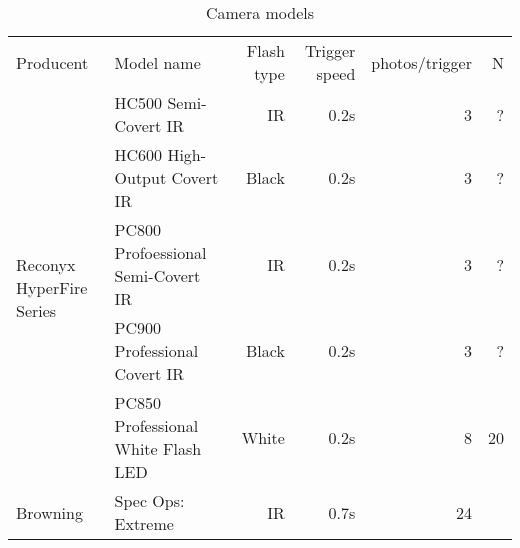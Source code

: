 \begin{table}
\caption{\label{tab:cam_mod} Camera models}
\centering

\begin{tabular}{llrrrr}
\hline
Producent  & Model name & Flash type & Trigger speed & photos/trigger & N \\
\cline{1-2}
\multirow{5}{2cm}{Reconyx HyperFire Series} &
	  HC500 Semi-Covert IR					& IR	& 0.2s & 3 & ? \\
	& HC600 High-Output Covert IR			& Black	& 0.2s & 3 & ? \\
    & PC800 Profoessional Semi-Covert IR 	& IR	& 0.2s & 3 & ? \\
    & PC900 Professional Covert IR 		& Black	& 0.2s & 3 & ? \\
    & PC850 Professional White Flash LED	& White	& 0.2s & 8 & 20 \\
\cline{1-2}
Browning  & Spec Ops: Extreme 				& IR	& 0.7s & ~ 24  \\
\hline
\end{tabular}

\end{table}
